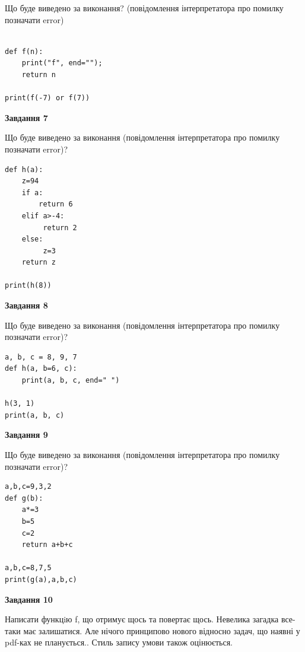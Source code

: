 \documentclass[12pt, ukrainian]{article}
\begin{document}
{\begin {large}
Що буде виведено за виконання? (повідомлення інтерпретатора про помилку позначати error)\par
\begin{verbatim}

def f(n):
    print("f", end="");
    return n

print(f(-7) or f(7))
\end{verbatim}

{\begin {center}\textbf{Завдання 7}\end {center}}

Що буде виведено за виконання (повідомлення інтерпретатора про помилку позначати error)?\par
\begin{verbatim}
def h(a):
    z=94
    if a: 
        return 6
    elif a>-4:
         return 2
    else:
         z=3
    return z

print(h(8))
\end{verbatim}

{\begin {center}\textbf{Завдання 8}\end {center}}

Що буде виведено за виконання (повідомлення інтерпретатора про помилку позначати error)?\par
\begin{verbatim}
a, b, c = 8, 9, 7
def h(a, b=6, c):
    print(a, b, c, end=" ")

h(3, 1)
print(a, b, c)
\end{verbatim}

{\begin {center}\textbf{Завдання 9}\end {center}}

Що буде виведено за виконання (повідомлення інтерпретатора про помилку позначати error)?\par
\begin{verbatim}
a,b,c=9,3,2
def g(b):
    a*=3
    b=5
    c=2
    return a+b+c

a,b,c=8,7,5
print(g(a),a,b,c)
\end{verbatim}

{\begin {center}\textbf{Завдання 10}\end {center}}


Написати функцiю f, що отримує щось та повертає щось. Невелика загадка все-таки має залишатися. Але нічого принципово нового відносно задач, що наявні у pdf-ках не планується.. Стиль запису умови також оцінюється.\par
\end {large}}
\newpage
\end{document}
